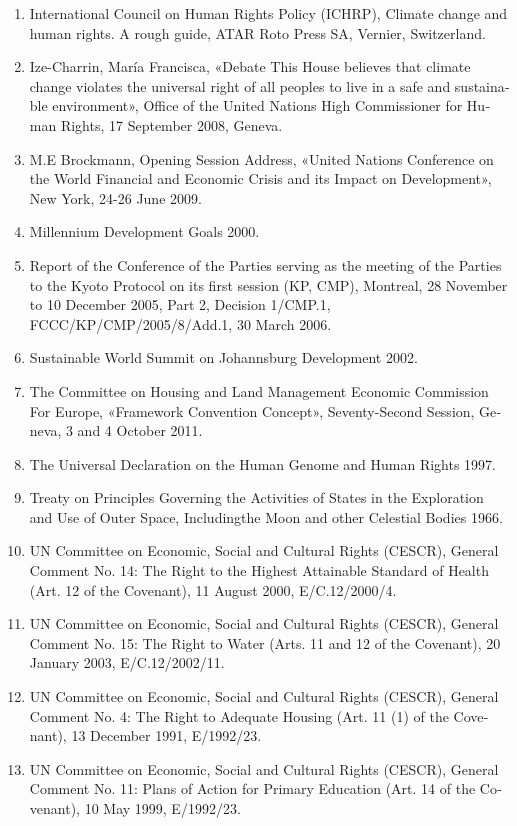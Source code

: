{{{\begin{latin}
\begin{enumerate}
\item International Council on Human Rights Policy (ICHRP), Climate change and human rights. A rough guide, ATAR Roto Press SA, Vernier, Switzerland.
\item Ize-Charrin, María Francisca, «Debate This House believes that climate change violates the universal right of all peoples to live in a safe and sustainable environment», Office of the United Nations High Commissioner for Human Rights, 17 September 2008, Geneva.
\item M.E Brockmann, Opening Session Address, «United Nations Conference on the World Financial and Economic Crisis and its Impact on Development», New York, 24-26 June 2009.
\item Millennium Development Goals 2000.
\item Report of the Conference of the Parties serving as the meeting of the Parties to the Kyoto Protocol on its first session (KP, CMP), Montreal, 28 November to 10 December 2005, Part 2, Decision 1/CMP.1, FCCC/KP/CMP/2005/8/Add.1, 30 March 2006.
\item Sustainable World Summit on Johannsburg Development 2002.
\item The Committee on Housing and Land Management Economic Commission For Europe, «Framework Convention Concept», Seventy-Second Session, Geneva, 3 and 4 October 2011.
\item The Universal Declaration on the Human Genome and Human Rights 1997.
\item Treaty on Principles Governing the Activities of States in the Exploration and Use of Outer Space, Includingthe Moon and other Celestial Bodies 1966.
\item UN Committee on Economic, Social and Cultural Rights (CESCR), General Comment No. 14: The Right to the Highest Attainable Standard of Health (Art. 12 of the Covenant), 11 August 2000, E/C.12/2000/4.
\item UN Committee on Economic, Social and Cultural Rights (CESCR), General Comment No. 15: The Right to Water (Arts. 11 and 12 of the Covenant), 20 January 2003, E/C.12/2002/11.
\item UN Committee on Economic, Social and Cultural Rights (CESCR), General Comment No. 4: The Right to Adequate Housing (Art. 11 (1) of the Covenant), 13 December 1991, E/1992/23.
\item UN Committee on Economic, Social and Cultural Rights (CESCR), General Comment No. 11: Plans of Action for Primary Education (Art. 14 of the Covenant), 10 May 1999, E/1992/23.

\end{enumerate}
\end{latin}}}}
